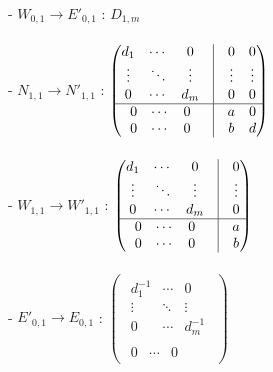 - $W_{0,1}\rightarrow E'_{0,1}$ : $D_{1,m}$\\
\\
- $N_{1,1}\rightarrow N'_{1,1}$ : 
$
\begin{pmatrix}
		\begin{matrix} 
			d_{1} & \cdots & 0 \\ 
			\vdots & \ddots & \vdots\\
			0 & \cdots & d_m
		\end{matrix} & \vline &
		\begin{matrix}
			0&0\\
			\vdots&\vdots\\
			0&0
		\end{matrix}\\
		\hline
		\begin{matrix}
			0&\cdots&0\\
			0&\cdots&0
		\end{matrix}
		& \vline &
		\begin{matrix}
			a&0\\
			b& d
		\end{matrix}
\end{pmatrix}
$\\
\\
- $W_{1,1}\rightarrow W'_{1,1}$ : 
$
\begin{pmatrix}
		\begin{matrix} 
			d_{1} & \cdots & 0 \\ 
			\vdots & \ddots & \vdots\\
			0 & \cdots & d_m
		\end{matrix} & \vline &
		\begin{matrix}
			0\\
			\vdots\\
			0
		\end{matrix}\\
		\hline
		\begin{matrix}
			0&\cdots&0\\
			0&\cdots&0
		\end{matrix}
		& \vline &
		\begin{matrix}
			a\\
			b
		\end{matrix}
\end{pmatrix}
$\\
\\
- $E'_{0,1}\rightarrow E_{0,1}$ : 
$
\begin{pmatrix}
		\begin{matrix} 
			d_{1}^{-1} & \cdots & 0 \\ 
			\vdots & \ddots & \vdots\\
			0 & \cdots & d_m^{-1}
		\end{matrix} \\
		\hline
		\begin{matrix} 
			0 & \cdots & 0 
		\end{matrix} 
\end{pmatrix}
$\\

